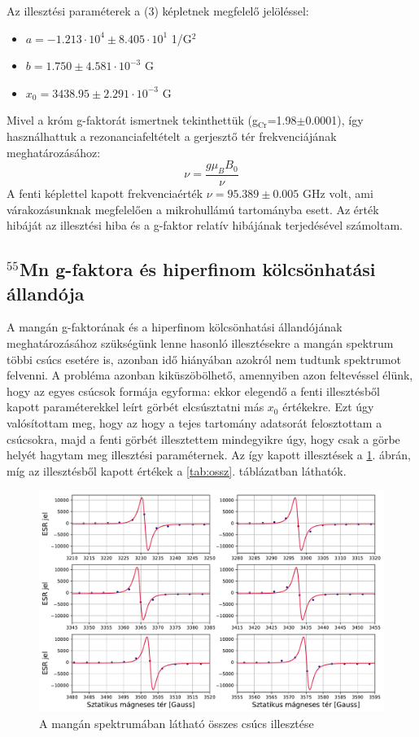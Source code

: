 \documentclass[12pt,a4paper]{article}
\begin{document}
\newline
Az illesztési paraméterek a (3) képletnek megfelelő jelöléssel:
\begin{itemize}
\item{$a=-1.213 \cdot 10^{4} \pm 8.405 \cdot 10^{1}$ 1/G$^2$}
\item{$b=1.750 \pm 4.581 \cdot 10^{-3}$ G}
\item{$x_0=3438.95 \pm 2.291 \cdot 10^{-3}$ G}
\end{itemize}
Mivel a króm g-faktorát ismertnek tekinthettük (g$_{\textrm{Cr}}$=1.98$\pm$0.0001), így használhattuk a rezonanciafeltételt a gerjesztő tér frekvenciájának meghatározásához:
\begin{equation}
\nu = \frac{g\mu_B B_0}{\nu}
\end{equation}
A fenti képlettel kapott frekvenciaérték $\nu=95.389 \pm 0.005$ GHz volt, ami várakozásunknak megfelelően a mikrohullámú tartományba esett. Az érték hibáját az illesztési hiba és a g-faktor relatív hibájának terjedésével számoltam. \\

\subsection{$^{55}$Mn g-faktora és hiperfinom kölcsönhatási állandója}
A mangán g-faktorának és a hiperfinom kölcsönhatási állandójának meghatározásához szükségünk lenne hasonló illesztésekre a mangán spektrum többi csúcs esetére is, azonban idő hiányában azokról nem tudtunk spektrumot felvenni. A probléma azonban kiküszöbölhető, amennyiben azon feltevéssel élünk, hogy az egyes csúcsok formája egyforma: ekkor elegendő a fenti illesztésből kapott paraméterekkel leírt görbét elcsúsztatni más $x_0$ értékekre. Ezt úgy valósítottam meg, hogy az hogy a tejes tartomány adatsorát felosztottam a csúcsokra, majd a fenti görbét illesztettem mindegyikre úgy, hogy csak a görbe helyét hagytam meg illesztési paraméternek. Az így kapott illesztések a \ref{fig:mn_ossz}. ábrán, míg az illesztésből kapott értékek a  \ref{tab:ossz}. táblázatban láthatók.\\

\begin{figure}[!h]
\centering
\includegraphics[scale=0.55]{mang_teljes_fits}
\caption{A mangán spektrumában látható összes csúcs illesztése}
\label{fig:mn_ossz}
\end{figure}
\end{document}
